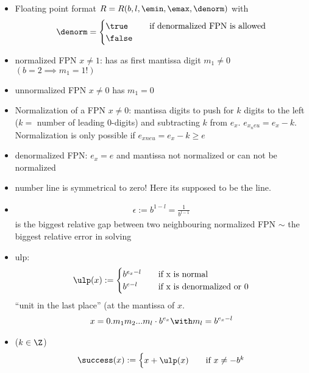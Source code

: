 \begin{itemize}
    \item  Floating point format $R=R(b,l,\emin,\emax,\denorm)$
    with
    \begin{align*}
    	\denorm = \begin{cases}
    		\true &\quad\text{if denormalized FPN is allowed}\\
    		\false &\quad\\
    	\end{cases}
    \end{align*}
  \item normalized FPN $x\neq 1$: has as first mantissa digit $m_1\neq 0$ $(b=2 \implies m_1=1!)$
  \item unnormalized FPN $x\neq0$ has $m_1=0$
  \item Normalization of a FPN $x \neq 0$: mantissa digits to push for $k$ digits to the left ($k =$  number of leading 0-digits) and subtracting $k$ from $e_x$. $e_{x_neu}=e_x-k$.
   Normalization is only possible if $e_{xneu} = e_x-k \ge e$
  \item denormalized FPN: $e_x = e$ and mantissa not normalized or can not be normalized
  \item number line is symmetrical to zero! Here its supposed to be the line.
  \item {}
  \begin{align*}
  	\epsilon:=b^{1-l}=\frac{1}{b^{l-1}}
  \end{align*}
  is the biggest relative gap between two neighbouring normalized FPN $\sim$ the biggest relative error in solving 
  \item {} ulp:
  \begin{align*}
    \ulp(x) := \begin{cases}
    	b^{e_x-l} &\quad\text{if x is normal}\\
    	b^{e-l} &\quad\text{if x is denormalized or }0
    \end{cases}
  \end{align*} 
 ``unit in the last place'' (at the mantissa of $x$. 
  \begin{align*}
  	x=0.m_1 m_2...m_l\cdot b^{e_x} \with m_l = b^{e_x - l}
  \end{align*}
  \item {} ($k \in \Z$)
  \begin{align*}
  	\success(x) := \begin{cases}
  		x+\ulp(x) &\quad \text{if } x\neq -b^k\\

\end{cases}
\end{align*}
\end{itemize}
